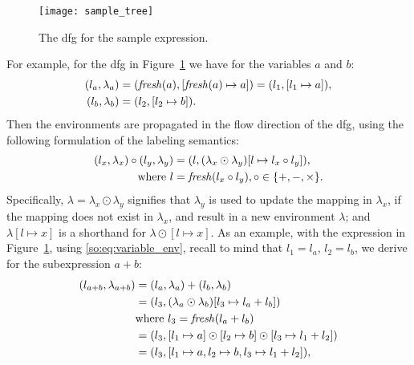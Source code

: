 \begin{figure}[ht]
    \centering
    \texttt{[image: sample\_tree]}
    \caption{%
        The \gls{dfg} for the sample expression.
    }\label{so:fig:sample_tree}
\end{figure}
For example, for the \gls{dfg} in Figure~\ref{so:fig:sample_tree} we have for
the variables $a$ and $b$:
\begin{equation}
    \begin{aligned}
        (l_a, \lambda_a) &= (\operatorname{\mathit{fresh}}(a), [\operatorname{\mathit{fresh}}(a)\mapsto{a}])
                   = (l_1, [l_1 \mapsto a]), \\
        (l_b, \lambda_b) &= (l_2, [l_2 \mapsto b]).
    \end{aligned}
    \label{so:eq:variable_env}
\end{equation}
Then the environments are propagated in the flow direction of the \gls{dfg},
using the following formulation of the labeling semantics:
\begin{equation}
    \begin{aligned}
        (l_x, \lambda_x) \circ (l_y, \lambda_y)
            &= (l, (\lambda_x\odot\lambda_y)
                      [l\mapsto{l_x \circ l_y}]), \\
            \text{where~} l &= \operatorname{\mathit{fresh}}(l_x \circ l_y),
                          \circ\in\{+, -, \times\}.
    \end{aligned}
    \label{so:eq:labeling_semantics}
\end{equation}
Specifically, $\lambda=\lambda_x\odot\lambda_y$ signifies that $\lambda_y$
is used to update the mapping in $\lambda_x$, if the mapping does not
exist in $\lambda_x$, and result in a new environment $\lambda$; and
$\lambda[l\mapsto{x}]$ is a shorthand for $\lambda\odot[l\mapsto{x}]$.  As
an example, with the expression in Figure~\ref{so:fig:sample_tree}, using
\eqref{so:eq:variable_env}, recall to mind that $l_1 = l_a$, $l_2 = l_b$, we
derive for the subexpression $a + b$:
\begin{equation}
    \begin{aligned}
        (l_{a + b}, \lambda_{a + b})
            &= (l_a, \lambda_a) + (l_b, \lambda_b) \\
            &= (l_3, (\lambda_a \odot \lambda_b) [l_3\mapsto{l_a + l_b}]) \\
            &  \text{where~} l_3 = \operatorname{\mathit{fresh}}(l_a + l_b) \\
            &= (l_3, [l_1\mapsto{a}]\odot
                     [l_2\mapsto{b}]\odot
                     [l_3\mapsto{l_1 + l_2}]) \\
            &= (l_3, [l_1\mapsto{a}, l_2\mapsto{b}, l_3\mapsto{l_1 + l_2}]),
    \end{aligned}
\end{equation}
